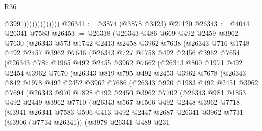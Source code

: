 \begin{lexlean}{R36}
\begin{coremodule}
                              @3991)))))))))))))
@26341 := @3874 (@3878 @3423) @21120
@26343 := @4044 @26341 @7583
@26453 := @26338
    (@26343
      @486
      @669
      @492
      @2459
      @3962
      @7630
      (@26343
        @573
        @1742
        @2413
        @2458
        @3962
        @7638
        (@26343
          @716
          @1748
          @492
          @2457
          @3962
          @7646
          (@26343
            @727
            @1758
            @492
            @2456
            @3962
            @7654
            (@26343
              @787
              @1965
              @492
              @2455
              @3962
              @7662
              (@26343
                @800
                @1971
                @492
                @2454
                @3962
                @7670
                (@26343
                  @819
                  @795
                  @492
                  @2453
                  @3962
                  @7678
                  (@26343
                    @842
                    @1978
                    @492
                    @2452
                    @3962
                    @7686
                    (@26343
                      @920
                      @1983
                      @492
                      @2451
                      @3962
                      @7694
                      (@26343
                        @970
                        @1828
                        @492
                        @2450
                        @3962
                        @7702
                        (@26343
                          @981
                          @1853
                          @492
                          @2449
                          @3962
                          @7710
                          (@26343
                            @567
                            @1506
                            @492
                            @2448
                            @3962
                            @7718
                            (@3941
                              @26341
                              @7583
                              @596
                              @413
                              @492
                              @2447
                              @2687
                              @26341
                              @3962
                              @7731
                              (@3906 (@7734 @26341))
                              (@3978
                                @26341
                                @489
                                @231

\end{coremodule}
\end{lexlean}
